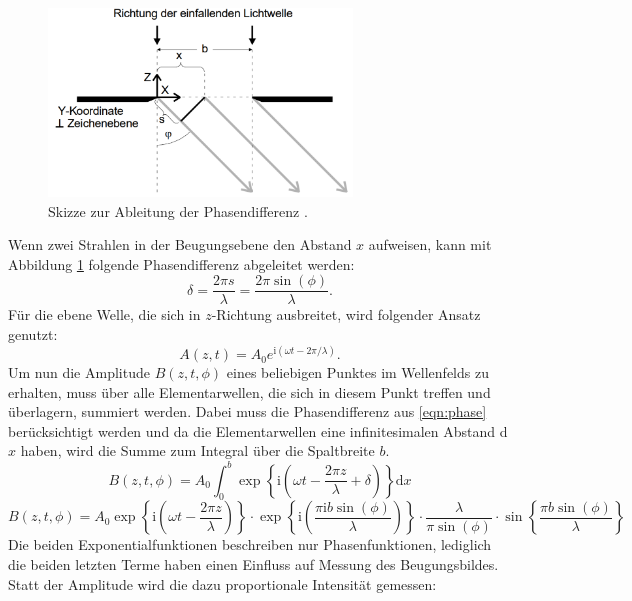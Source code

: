\begin{figure}
  \centering
  \includegraphics[height=5cm]{data/phase.png}
  \caption{Skizze zur Ableitung der Phasendifferenz \cite{sample}.}
  \label{fig:phase}
\end{figure}
Wenn zwei Strahlen in der Beugungsebene den Abstand $x$ aufweisen, kann mit Abbildung \ref{fig:phase} folgende Phasendifferenz abgeleitet werden:
\begin{equation}
  \delta = \frac{2\pi s}{\lambda} = \frac{2 \pi \sin(\phi)}{\lambda}.
  \label{eqn:phase}
\end{equation}
Für die ebene Welle, die sich in $z$-Richtung ausbreitet, wird folgender Ansatz genutzt:
\begin{equation}
  A(z,t) = A_0 e^{\text{i}(\omega t - 2\pi / \lambda)}.
\end{equation}
Um nun die Amplitude $B(z,t,\phi)$ eines beliebigen Punktes im Wellenfelds zu erhalten, muss über alle Elementarwellen, die sich in diesem Punkt treffen und überlagern, summiert werden.
Dabei muss die Phasendifferenz aus \eqref{eqn:phase} berücksichtigt werden und da die Elementarwellen eine infinitesimalen Abstand d$x$ haben,
wird die Summe zum Integral über die Spaltbreite $b$.
\begin{equation}
  B(z,t,\phi) = A_0 \int_{0}^{b} \exp\left\{\text{i}\left(\omega t - \frac{2\pi z}{\lambda} + \delta \right)\right\} \text{d}x
\end{equation}
\begin{equation}
  B(z,t,\phi) = A_0 \exp\left\{\text{i}\left(\omega t - \frac{2\pi z}{\lambda} \right)\right\} \cdot
  \exp\left\{\text{i}\left( \frac{\pi \text{i} b \sin(\phi) }{\lambda} \right)\right\} \cdot
  \frac{\lambda}{\pi \sin(\phi)} \cdot \sin \left\{ \frac{\pi b \sin(\phi)}{\lambda} \right\}
\end{equation}
Die beiden Exponentialfunktionen beschreiben nur Phasenfunktionen, lediglich die beiden letzten Terme haben einen Einfluss auf Messung des Beugungsbildes.
Statt der Amplitude wird die dazu proportionale Intensität gemessen:

